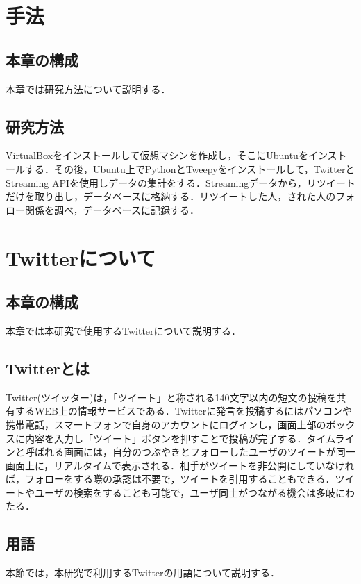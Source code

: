\chapter{手法}

\section{本章の構成}
本章では研究方法について説明する．
\section{研究方法}

VirtualBoxをインストールして仮想マシンを作成し，そこにUbuntuをインストールする．その後，Ubuntu上でPythonとTweepyをインストールして，TwitterとStreaming APIを使用しデータの集計をする．Streamingデータから，リツイートだけを取り出し，データベースに格納する．リツイートした人，された人のフォロー関係を調べ，データベースに記録する．

\chapter{Twitterについて}


\section{本章の構成}
本章では本研究で使用するTwitterについて説明する．

\section{Twitterとは}
Twitter(ツイッター)は，「ツイート」と称される140文字以内の短文の投稿を共有するWEB上の情報サービスである．Twitterに発言を投稿するにはパソコンや携帯電話，スマートフォンで自身のアカウントにログインし，画面上部のボックスに内容を入力し「ツイート」ボタンを押すことで投稿が完了する．タイムラインと呼ばれる画面には，自分のつぶやきとフォローしたユーザのツイートが同一画面上に，リアルタイムで表示される．相手がツイートを非公開にしていなければ，フォローをする際の承認は不要で，ツイートを引用することもできる．ツイートやユーザの検索をすることも可能で，ユーザ同士がつながる機会は多岐にわたる．



\section{用語}
本節では，本研究で利用するTwitterの用語について説明する．

